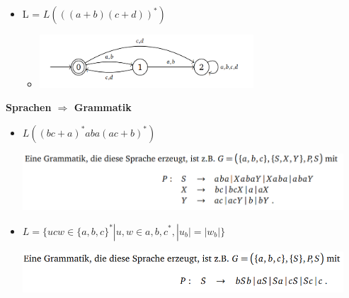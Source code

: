 \documentclass[11pt,a4paper]{article}
\begin{document}
\begin{itemize}
\item L = $L(((a+b)(c+d))^*)$
	\begin{itemize}
	\item[]
		\begin{center}
		\includegraphics[width=8cm]{Bilder/auto7}
		\end{center}	
	\end{itemize}

\end{itemize}

\pagebreak

{\Large \textbf{Sprachen $\Rightarrow$ Grammatik}
\begin{itemize}

\item $L((bc + a)^*aba(ac+b)^*)$
\begin{center}
\includegraphics[width=12cm]{Bilder/gram1}
\end{center}

\item $L=\{ucw \in \{a,b,c\}^* | u,w \in {a,b,c}^*, |u_b| = |w_b|\}$
\begin{center}
\includegraphics[width=12cm]{Bilder/gram2}
\end{center}


\end{itemize}}
\end{document}
